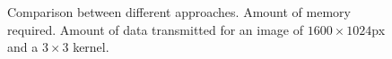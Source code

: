 \documentclass[conference,compsoc]{IEEEtran}
\begin{document}
\begin{figure}[!t]
\centering
{}
\hfil \vspace{0.1cm}
\centering
{}
\caption{Comparison between different approaches. \protect{} Amount of
  memory required. \protect{} Amount of data transmitted for an image of $1600\times1024$px and a $3\times3$ kernel.}
\label{comp}
\end{figure}
\end{document}
